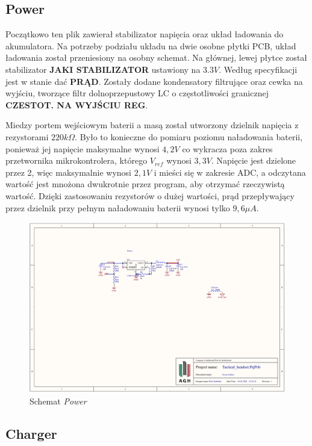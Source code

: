 \subsection{Power}

Początkowo ten plik zawierał stabilizator napięcia oraz układ ładowania do akumulatora. Na potrzeby podziału układu na dwie osobne płytki PCB, układ ładowania został przeniesiony na osobny schemat. Na głównej, lewej płytce został stabilizator \textbf{JAKI STABILIZATOR} ustawiony na $3.3V$. Według specyfikacji jest w stanie dać \textbf{PRĄD}. Zostały dodane kondensatory filtrujące oraz cewka na wyjściu, tworzące filtr dolnoprzepustowy LC o częstotliwości granicznej \textbf{CZESTOT. NA WYJŚCIU REG}. 

Miedzy portem wejściowym baterii a masą został utworzony dzielnik napięcia z rezystorami $220k \Omega $. Było to konieczne do pomiaru poziomu naładowania baterii, ponieważ jej napięcie maksymalne wynosi $4,2V$ co wykracza poza zakres przetwornika mikrokontrolera, którego $V_{ref}$ wynosi $3,3V$. Napięcie jest dzielone przez 2, więc maksymalnie wynosi $2,1V$ i mieści się w zakresie ADC, a odczytana wartość jest mnożona dwukrotnie przez program, aby otrzymać rzeczywistą wartość. Dzięki zastosowaniu rezystorów o dużej wartości, prąd przepływający przez dzielnik przy pełnym naładowaniu baterii wynosi tylko $9,6\mu A$.

\begin{figure}[H]
	\centering
	\includegraphics[scale=0.4]{zdjecia/PCB/power.png}
	\caption{\label{power} Schemat \textit{Power}}
\end{figure}


\subsection{Charger}

